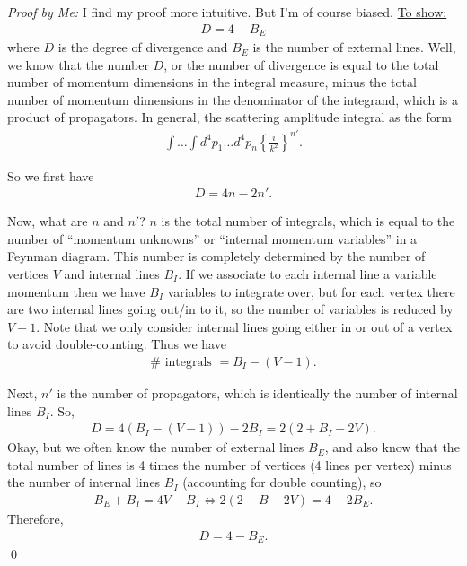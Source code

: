 \documentclass{book}
\theoremstyle{definition}
\newcommand{\f}[2]{\frac{#1}{#2}}
\newcommand{\lc}{\left\{}
\newcommand{\rc}{\right\}}
\begin{document}
\noindent \textit{Proof by Me:} I find my proof more intuitive. But I'm of course biased. \underline{To show:}
\begin{align}
D = 4 - B_E
\end{align}
where $D$ is the degree of divergence and $B_E$ is the number of external lines. Well, we know that the number $D$, or the number of divergence is equal to the total number of momentum dimensions in the integral measure, minus the total number of momentum dimensions in the denominator of the integrand, which is a product of propagators. In general, the scattering amplitude integral as the form
\begin{align}
\int \dots \int d^4 p_1 \dots d^4 p_n \lc \f{i}{k^2} \rc^{n'}. 
\end{align} 

So we first have
\begin{align}
D = 4n - 2n'.
\end{align}

Now, what are $n$ and $n'$? $n$ is the total number of integrals, which is equal to the number of ``momentum unknowns'' or ``internal momentum variables'' in a Feynman diagram. This number is completely determined by the number of vertices $V$ and internal lines $B_I$. If we associate to each internal line a variable momentum then we have $B_I$ variables to integrate over, but for each vertex there are two internal lines going out/in to it, so the number of variables is reduced by $V-1$. Note that we only consider internal lines going either in or out of a vertex to avoid double-counting. Thus we have 
\begin{align}
{\#} \text{ integrals } = B_I - (V - 1).
\end{align}

Next, $n'$ is the number of propagators, which is identically the number of internal lines $B_I$. So, 
\begin{align}
D = 4(B_I - (V - 1)) - 2B_I = 2(2 + B_I - 2V).
\end{align}
Okay, but we often know the number of external lines $B_E$, and also know that the total number of lines is 4 times the number of vertices (4 lines per vertex) minus the number of internal lines $B_I$ (accounting for double counting), so
\begin{align}
B_E + B_I = 4V - B_I \iff 2(2 + B - 2V) = 4 - 2B_E. 
\end{align}
Therefore,
\begin{align}
D = 4 - B_E.
\end{align}
\qed\\
\end{document}
